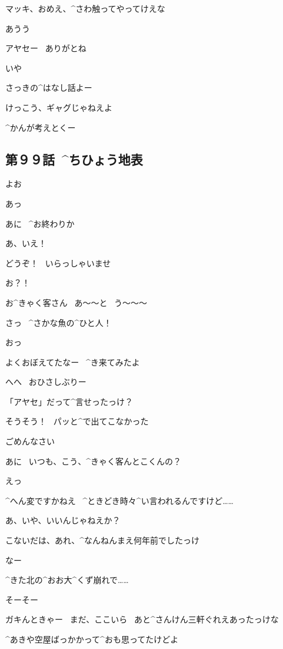 \Ayase マッキ、おめえ、^{さわ}{触}ってやってけえな

\page[149]
\Makki あうう

\page[150]
\Makki アヤセー
\ ありがとね

\Ayase いや

\Ayase さっきの^{はなし}{話}よー

\Ayase けっこう、ギャグじゃねえよ

\Makki ^{かんが}{考}えとくー


\subsection{第９９話\ ^{ちひょう}{地表}}

\page[156]
\Ayase よお

\Alpha あっ

\Ayase あに
\ ^{お}{終}わりか

\Alpha あ、いえ！

\Alpha どうぞ！
\ いらっしゃいませ

\page[157]
\Alpha お？！

\Alpha お^{きゃく}{客}さん
\ あ〜〜と
\ う〜〜〜

\Alpha さっ
\ ^{さかな}{魚}の^{ひと}{人}！

\Ayase おっ

\Ayase よくおぼえてたなー
\ ^{き}{来}てみたよ

\Alpha へへ
\ おひさしぶりー

\Ayase 「アヤセ」だって^{言}{せ}ったっけ？

\Alpha そうそう！
\ パッと^{で}{出}てこなかった

\Alpha ごめんなさい

\page[158]
\Ayase あに
\ いつも、こう、^{きゃく}{客}んとこくんの？

\Alpha えっ

\Alpha ^{へん}{変}ですかねえ
\ ^{ときどき}{時々}^{い}{言}われるんですけど……

\Ayase あ、いや、いいんじゃねえか？

\page[159]
\Alpha こないだは、あれ、^{なんねんまえ}{何年前}でしたっけ

\Ayase なー

\Ayase ^{きた}{北}の^{おお}{大}^{くず}{崩}れで……

\Alpha そーそー

\page[160]
\Ayase ガキんときゃー
\ まだ、ここいら
\ あと^{さんけん}{三軒}ぐれえあったっけな

\Ayase ^{あきや}{空屋}ばっかかって^{おも}{思}ってたけどよ

